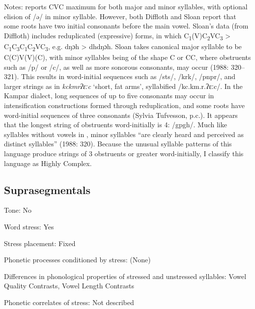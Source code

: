 {\begin{appendixdesc}
\item[Notes:] \citet{Philips2007} reports CVC maximum for both major and minor syllables, with optional elision of /ə/ in minor syllable. However, both Diffloth and Sloan report that some roots have two initial consonants before the main vowel. Sloan’s data (from Diffloth) includes reduplicated (expressive) forms, in which C\textsubscript{1}(V)C\textsubscript{2}VC\textsubscript{3} > C\textsubscript{1}C\textsubscript{3}C\textsubscript{1}C\textsubscript{2}VC\textsubscript{3}, e.g. dŋɔh > dhdŋɔh. Sloan takes canonical major syllable to be C(C)V(V)(C), with minor syllables being of the shape C or CC, where obstruents such as /p/ or /c/, as well as more sonorous consonants, may occur (1988: 320--321). This results in word-initial sequences such as /sts/, /krk/, /pnpr/, and larger strings as in \textit{kckmrʔɛːc} ‘short, fat arms’, syllabified /kc.km.r.ʔɛːc/. In the Kampar dialect, long sequences of up to five consonants may occur in intensification constructions formed through reduplication, and some roots have word-initial sequences of three consonants (Sylvia Tufvesson, p.c.). It appears that the longest string of obstruents word-initially is 4: /gpgh/. Much like syllables without vowels in ,  minor syllables “are clearly heard and perceived as distinct syllables” (1988: 320). Because the unusual syllable patterns of this language produce strings of 3 obstruents or greater word-initially, I classify this language as Highly Complex.
\end{appendixdesc}
\subsection*{Suprasegmentals}
\begin{appendixdesc}
\item[Tone:] No

\item[Word stress:] Yes

\item[Stress placement:] Fixed

\item[Phonetic processes conditioned by stress:] (None)

\item[Differences in phonological properties of stressed and unstressed syllables:] Vowel Quality Contrasts, Vowel Length Contrasts

\item[Phonetic correlates of stress:] Not described
\end{appendixdesc}
}
